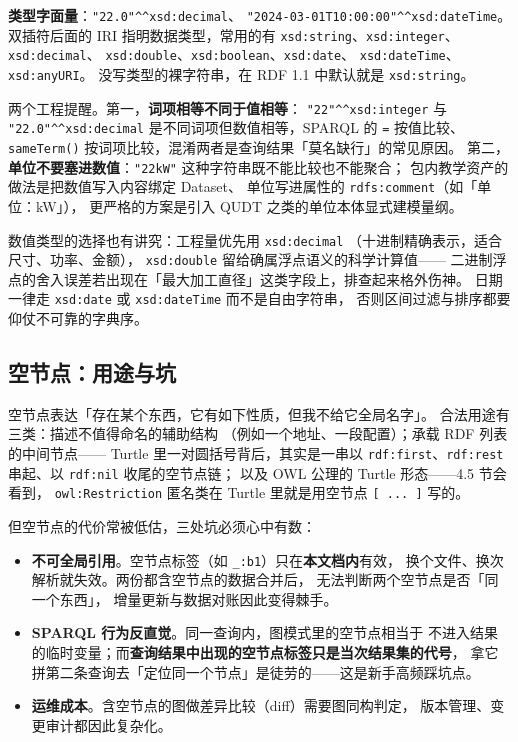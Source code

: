 \textbf{类型字面量}：\texttt{"22.0"\^{}\^{}xsd:decimal}、
\texttt{"2024-03-01T10:00:00"\^{}\^{}xsd:dateTime}。
双插符后面的 IRI 指明数据类型，常用的有
\texttt{xsd:string}、\texttt{xsd:integer}、\texttt{xsd:decimal}、
\texttt{xsd:double}、\texttt{xsd:boolean}、\texttt{xsd:date}、
\texttt{xsd:dateTime}、\texttt{xsd:anyURI}。
没写类型的裸字符串，在 RDF 1.1 中默认就是 \texttt{xsd:string}。

两个工程提醒。第一，\textbf{词项相等不同于值相等}：
\texttt{"22"\^{}\^{}xsd:integer} 与 \texttt{"22.0"\^{}\^{}xsd:decimal}
是不同词项但数值相等，SPARQL 的 \texttt{=} 按值比较、
\texttt{sameTerm()} 按词项比较，混淆两者是查询结果「莫名缺行」的常见原因。
第二，\textbf{单位不要塞进数值}：\texttt{"22kW"} 这种字符串既不能比较也不能聚合；
包内教学资产的做法是把数值写入内容绑定 Dataset、
单位写进属性的 \texttt{rdfs:comment}（如「单位：kW」），
更严格的方案是引入 QUDT 之类的单位本体显式建模量纲。

数值类型的选择也有讲究：工程量优先用 \texttt{xsd:decimal}
（十进制精确表示，适合尺寸、功率、金额），
\texttt{xsd:double} 留给确属浮点语义的科学计算值——
二进制浮点的舍入误差若出现在「最大加工直径」这类字段上，排查起来格外伤神。
日期一律走 \texttt{xsd:date} 或 \texttt{xsd:dateTime} 而不是自由字符串，
否则区间过滤与排序都要仰仗不可靠的字典序。

\subsection{空节点：用途与坑}

空节点表达「存在某个东西，它有如下性质，但我不给它全局名字」。
合法用途有三类：描述不值得命名的辅助结构
（例如一个地址、一段配置）；承载 RDF 列表的中间节点——
Turtle 里一对圆括号背后，其实是一串以 \texttt{rdf:first}、\texttt{rdf:rest}
串起、以 \texttt{rdf:nil} 收尾的空节点链；
以及 OWL 公理的 Turtle 形态——4.5 节会看到，
\texttt{owl:Restriction} 匿名类在 Turtle 里就是用空节点 \texttt{[ ... ]} 写的。

但空节点的代价常被低估，三处坑必须心中有数：

\begin{itemize}
  \item \textbf{不可全局引用}。空节点标签（如 \texttt{\_:b1}）只在\textbf{本文档内}有效，
        换个文件、换次解析就失效。两份都含空节点的数据合并后，
        无法判断两个空节点是否「同一个东西」，
        增量更新与数据对账因此变得棘手。
  \item \textbf{SPARQL 行为反直觉}。同一查询内，图模式里的空节点相当于
        不进入结果的临时变量；而\textbf{查询结果中出现的空节点标签只是当次结果集的代号}，
        拿它拼第二条查询去「定位同一个节点」是徒劳的——这是新手高频踩坑点。
  \item \textbf{运维成本}。含空节点的图做差异比较（diff）需要图同构判定，
        版本管理、变更审计都因此复杂化。
\end{itemize}

